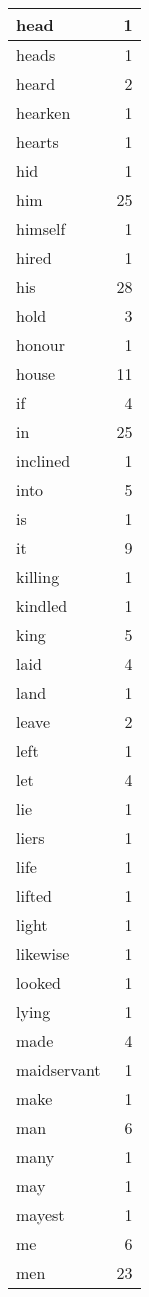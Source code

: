 \begin{center}
\begin{longtable}{l|r}
head & 1\\ \hline 
heads & 1\\ \hline 
heard & 2\\ \hline 
hearken & 1\\ \hline 
hearts & 1\\ \hline 
hid & 1\\ \hline 
him & 25\\ \hline 
himself & 1\\ \hline 
hired & 1\\ \hline 
his & 28\\ \hline 
hold & 3\\ \hline 
honour & 1\\ \hline 
house & 11\\ \hline 
if & 4\\ \hline 
in & 25\\ \hline 
inclined & 1\\ \hline 
into & 5\\ \hline 
is & 1\\ \hline 
it & 9\\ \hline 
killing & 1\\ \hline 
kindled & 1\\ \hline 
king & 5\\ \hline 
laid & 4\\ \hline 
land & 1\\ \hline 
leave & 2\\ \hline 
left & 1\\ \hline 
let & 4\\ \hline 
lie & 1\\ \hline 
liers & 1\\ \hline 
life & 1\\ \hline 
lifted & 1\\ \hline 
light & 1\\ \hline 
likewise & 1\\ \hline 
looked & 1\\ \hline 
lying & 1\\ \hline 
made & 4\\ \hline 
maidservant & 1\\ \hline 
make & 1\\ \hline 
man & 6\\ \hline 
many & 1\\ \hline 
may & 1\\ \hline 
mayest & 1\\ \hline 
me & 6\\ \hline 
men & 23\\ \hline 

\end{longtable}
\end{center}
